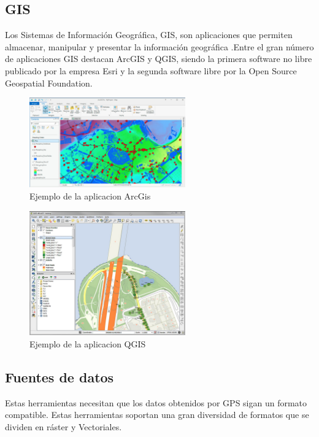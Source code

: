 \subsection{GIS}
Los Sistemas de Información Geográfica, \ac{GIS},  son aplicaciones que permiten almacenar, manipular y presentar la información geográfica \cite{EPA01}.Entre el gran número de aplicaciones GIS destacan ArcGIS y QGIS, siendo la primera software no libre publicado por la empresa Esri y la segunda software libre por la Open Source Geospatial Foundation.
\begin{figure}[htb]
\begin{center}
\includegraphics[width=0.6\textwidth]{./Imagenes/ArcGIS.png}
\caption{Ejemplo de la aplicacion ArcGis}
\label{fig:ArcGis01}
\end{center}
\end{figure}
\begin{figure}[htb]
\begin{center}
\includegraphics[width=0.6\textwidth]{./Imagenes/QGIS.png}
\caption{Ejemplo de la aplicacion QGIS}
\label{fig:QGIS01}
\end{center}
\end{figure}

\newpage
\subsection{Fuentes de datos}
Estas herramientas necesitan que los datos obtenidos por \ac{GPS}  sigan un formato compatible. 
Estas herramientas soportan una gran diversidad de formatos que se dividen en ráster y Vectoriales. 

